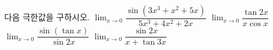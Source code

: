 다음 극한값을 구하시오.
 $\displaystyle\lim_{x\to 0}\dfrac{\sin(3x^3+x^2+5x)}{5x^3+4x^2+2x}$
 $\displaystyle\lim_{x\to 0}\dfrac{\tan 2x}{x\cos x}$
 $\displaystyle\lim_{x\to 0}\dfrac{\sin(\tan x)}{\sin 2x}$
 $\displaystyle\lim_{x\to 0}\dfrac{\sin 2x}{x+\tan 3x}$
